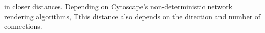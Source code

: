 \documentclass[arial,11pt]{article}
\begin{document}
in closer distances.  Depending on Cytoscape's non-deterministic network rendering algorithms, Tthis distance also depends on the direction and number of connections.
%
%

\end{document}
